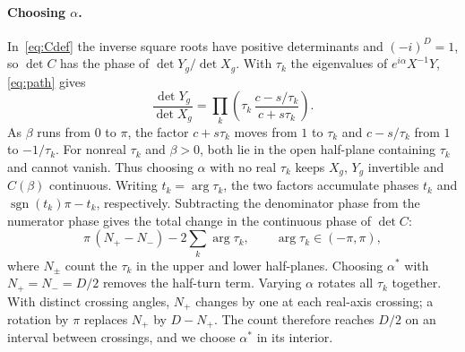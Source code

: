 \documentclass[11pt]{article}
\begin{document}
\paragraph{Choosing $\alpha$.} In~\eqref{eq:Cdef} the inverse square roots have positive
determinants and $(-i)^D=1$, so $\det C$ has the phase of $\det Y_g/\det X_g$. With $\tau_k$ the
eigenvalues of $e^{i\alpha}X^{-1}Y$, \eqref{eq:path} gives
\begin{equation}\label{eq:dets}
\frac{\det Y_g}{\det X_g}=\prod_k\left(\tau_k\,\frac{c-s/\tau_k}{c+s\tau_k}\right).
\end{equation}
As $\beta$ runs from $0$ to $\pi$, the factor $c+s\tau_k$ moves from $1$ to $\tau_k$ and $c-s/\tau_k$
from $1$ to $-1/\tau_k$. For nonreal $\tau_k$ and $\beta>0$, both lie in the open half-plane
containing $\tau_k$ and cannot vanish. Thus choosing $\alpha$ with no real $\tau_k$ keeps
$X_g$, $Y_g$ invertible and $C(\beta)$ continuous. Writing $t_k=\arg\tau_k$, the two factors accumulate phases $t_k$ and
$\operatorname{sgn}(t_k)\pi-t_k$, respectively. Subtracting the denominator phase from the
numerator phase gives the total change in the continuous phase of $\det C$:
\begin{equation}\label{eq:dphase}
\pi\,(N_+-N_-)-2\sum_k\arg\tau_k ,\qquad \arg\tau_k\in(-\pi,\pi),
\end{equation}
where $N_\pm$ count the $\tau_k$ in the upper and lower half-planes. Choosing $\alpha^\ast$ with
$N_+=N_-=D/2$ removes the half-turn term. Varying $\alpha$ rotates all $\tau_k$
together. With distinct crossing angles, $N_+$ changes by one at each real-axis crossing; a
rotation by $\pi$ replaces $N_+$ by $D-N_+$. The count therefore reaches $D/2$ on an interval
between crossings, and we choose $\alpha^\ast$ in its interior.
\end{document}
